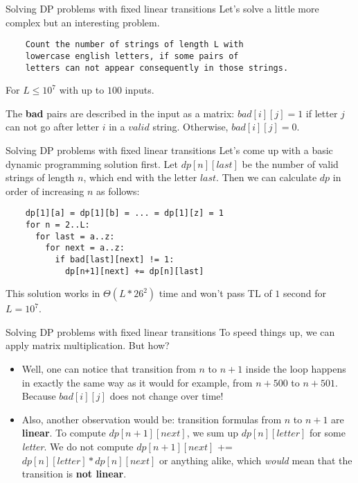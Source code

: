 \documentclass{beamer}
\begin{document}
\begin{frame}[fragile]{Solving DP problems with fixed linear transitions}
  Let's solve a little more complex but an interesting problem.
  \begin{lstlisting}
    Count the number of strings of length L with 
    lowercase english letters, if some pairs of
    letters can not appear consequently in those strings.     
  \end{lstlisting}
  \centerline{For $L \leq 10^7$ with up to $100$ inputs.}

  The \textbf{bad} pairs are described in the input as a matrix: 
  \newline
    $bad[i][j] = 1$ if letter $j$ can not go after letter $i$ in a $valid$ string.
  \newline
    Otherwise, $bad[i][j] = 0$.
\end{frame}

\begin{frame}[fragile]{Solving DP problems with fixed linear transitions}
  Let's come up with a basic dynamic programming solution first.
  \newline
  Let $dp[n][last]$ be the number of valid strings of length $n$, which end with the letter $last$.
  \newline
  Then we can calculate $dp$ in order of increasing $n$ as follows:
  \begin{lstlisting}
    dp[1][a] = dp[1][b] = ... = dp[1][z] = 1
    for n = 2..L:
      for last = a..z:
        for next = a..z:
          if bad[last][next] != 1:
            dp[n+1][next] += dp[n][last]
  \end{lstlisting}
  This solution works in $\Theta(L * 26^2)$ time and won't pass TL of $1$ second for $L = 10^7$.
\end{frame}

\begin{frame}[fragile]{Solving DP problems with fixed linear transitions}
  To speed things up, we can apply matrix multiplication. But how?
  \newline
  \begin{itemize}
    \item 
      Well, one can notice that transition from $n$ to $n + 1$ inside the loop
      happens in exactly the same way as it would for example, from $n + 500$ to $n + 501$.
      \newline Because $bad[i][j]$ does not change over time!
  \newline
    \item
      Also, another observation would be: 
      transition formulas from $n$ to $n + 1$ are \textbf{linear}.
      To compute $dp[n + 1][next]$, we sum up $dp[n][letter]$
      for some \textit{letter}.
      \newline 
      We do not compute
      $dp[n + 1][next]$ += $dp[n][letter] * dp[n][next]$ or anything alike,
      which \textit{would} mean that the transition is \textbf{not linear}.
  \end{itemize}
\end{frame}
\end{document}

